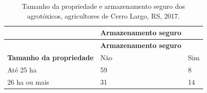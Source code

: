 \documentclass[12pt,brazil,oneside]{book}
\begin{document}
\begin{longtable}[]{@{}lll@{}}
\caption{\label{tab:tamprop}Tamanho da propriedade e armazenamento seguro dos agrotóxicos, agricultores de Cerro Largo, RS, 2017.}\tabularnewline
\toprule
\begin{minipage}[b]{0.35\columnwidth}\raggedright
\strut
\end{minipage} & \begin{minipage}[b]{0.32\columnwidth}\raggedright
\textbf{Armazenamento seguro}\strut
\end{minipage} & \begin{minipage}[b]{0.16\columnwidth}\raggedright
\strut
\end{minipage}\tabularnewline
\midrule
\endfirsthead
\toprule
\begin{minipage}[b]{0.35\columnwidth}\raggedright
\strut
\end{minipage} & \begin{minipage}[b]{0.32\columnwidth}\raggedright
\textbf{Armazenamento seguro}\strut
\end{minipage} & \begin{minipage}[b]{0.16\columnwidth}\raggedright
\strut
\end{minipage}\tabularnewline
\midrule
\endhead
\begin{minipage}[t]{0.35\columnwidth}\raggedright
\textbf{Tamanho da propriedade}\strut
\end{minipage} & \begin{minipage}[t]{0.32\columnwidth}\raggedright
Não\strut
\end{minipage} & \begin{minipage}[t]{0.16\columnwidth}\raggedright
Sim\strut
\end{minipage}\tabularnewline
\begin{minipage}[t]{0.35\columnwidth}\raggedright
Até 25 ha\strut
\end{minipage} & \begin{minipage}[t]{0.32\columnwidth}\raggedright
59\strut
\end{minipage} & \begin{minipage}[t]{0.16\columnwidth}\raggedright
8\strut
\end{minipage}\tabularnewline
\begin{minipage}[t]{0.35\columnwidth}\raggedright
26 ha ou mais\strut
\end{minipage} & \begin{minipage}[t]{0.32\columnwidth}\raggedright
31\strut
\end{minipage} & \begin{minipage}[t]{0.16\columnwidth}\raggedright
14\strut
\end{minipage}\tabularnewline
\bottomrule
\end{longtable}
\end{document}
